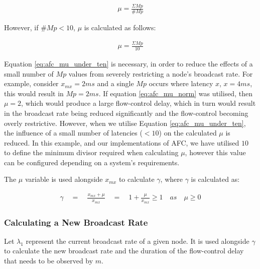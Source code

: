    \begin{equation}\label{eq:afc_mu_norm}
		     \begin{aligned}
		         \mu = \frac{\Sigma Mp}{\#Mp}
		     \end{aligned}
    \end{equation}
    
    However, if $\#Mp < 10$, $\mu$ is calculated as follows:
    
    \begin{equation}\label{eq:afc_mu_under_ten}
		     \begin{aligned}
		         \mu = \frac{\Sigma Mp}{10}
		     \end{aligned}
    \end{equation}
    
   Equation \ref{eq:afc_mu_under_ten} is necessary, in order to reduce the effects of a small number of $Mp$ values from severely restricting a node's broadcast rate.  For example, consider  $x_{mx} = 2ms$ and a single $Mp$ occurs where latency $x$, $x = 4ms$, this would result in $Mp = 2ms$.  If equation \ref{eq:afc_mu_norm} was utilised, then $\mu = 2$, which would produce a large flow-control delay, which in turn would result in the broadcast rate being reduced significantly and the flow-control becoming overly restrictive.  However, when we utilise Equation \ref{eq:afc_mu_under_ten}, the influence of a small number of latencies ($< 10$) on the calculated $\mu$ is reduced.  In this example, and our implementations of AFC, we have utilised $10$ to define the minimum divisor required when calculating $\mu$, however this value can be configured depending on a system's requirements.  
    
    The $\mu$ variable is used alongside $x_{mx}$ to calculate $\gamma$, where $\gamma$ is calculated as:
    
    \begin{equation}\label{eq:afc_gamma}
		     \begin{aligned}
		         \gamma \quad = \quad \frac{x_{mx} + \mu}{x_{mx}} \quad = \quad 1 + \frac{\mu}{x_{mx}} \geq 1 \quad as \quad \mu \geq 0
		     \end{aligned}
    \end{equation} 
    
    \subsubsection*{Calculating a New Broadcast Rate}
    Let $\lambda_1$ represent the current broadcast rate of a given node.  It is used alongside $\gamma$ to calculate the new broadcast rate and the duration of the flow-control delay that needs to be observed by $m$.  
    
